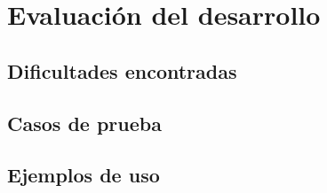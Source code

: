\chapter{Evaluación del desarrollo}

\section{Dificultades encontradas}

\section{Casos de prueba}

\section{Ejemplos de uso}